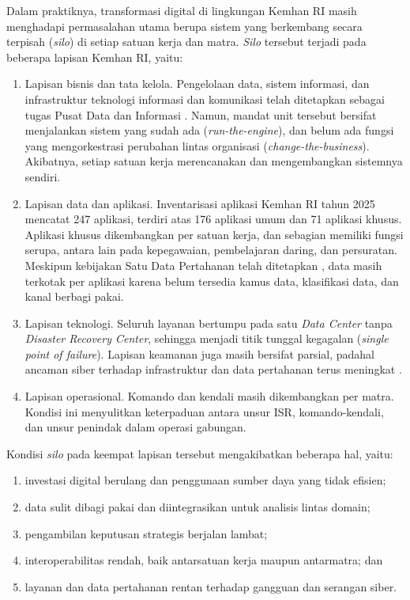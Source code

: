 Dalam praktiknya, transformasi digital di lingkungan Kemhan RI masih menghadapi permasalahan utama berupa sistem yang berkembang secara terpisah (\textit{silo}) di setiap satuan kerja dan matra. \textit{Silo} tersebut terjadi pada beberapa lapisan Kemhan RI, yaitu:
\begin{enumerate}[label=\arabic*.]
\item Lapisan bisnis dan tata kelola. Pengelolaan data, sistem informasi, dan infrastruktur teknologi informasi dan komunikasi telah ditetapkan sebagai tugas Pusat Data dan Informasi \cite{Permenhan30Tahun2025}. Namun, mandat unit tersebut bersifat menjalankan sistem yang sudah ada (\textit{run-the-engine}), dan belum ada fungsi yang mengorkestrasi perubahan lintas organisasi (\textit{change-the-business}). Akibatnya, setiap satuan kerja merencanakan dan mengembangkan sistemnya sendiri.
\item Lapisan data dan aplikasi. Inventarisasi aplikasi Kemhan RI tahun 2025 mencatat 247 aplikasi, terdiri atas 176 aplikasi umum dan 71 aplikasi khusus. Aplikasi khusus dikembangkan per satuan kerja, dan sebagian memiliki fungsi serupa, antara lain pada kepegawaian, pembelajaran daring, dan persuratan. Meskipun kebijakan Satu Data Pertahanan telah ditetapkan \cite{Permenhan1Tahun2023}, data masih terkotak per aplikasi karena belum tersedia kamus data, klasifikasi data, dan kanal berbagi pakai.
\item Lapisan teknologi. Seluruh layanan bertumpu pada satu \textit{Data Center} tanpa \textit{Disaster Recovery Center}, sehingga menjadi titik tunggal kegagalan (\textit{single point of failure}). Lapisan keamanan juga masih bersifat parsial, padahal ancaman siber terhadap infrastruktur dan data pertahanan terus meningkat \cite{Permenhan82Tahun2014}.
\item Lapisan operasional. Komando dan kendali masih dikembangkan per matra. Kondisi ini menyulitkan keterpaduan antara unsur ISR, komando-kendali, dan unsur penindak dalam operasi gabungan.
\end{enumerate}

Kondisi \textit{silo} pada keempat lapisan tersebut mengakibatkan beberapa hal, yaitu:
\begin{enumerate}[label=\alph*.]
\item investasi digital berulang dan penggunaan sumber daya yang tidak efisien;
\item data sulit dibagi pakai dan diintegrasikan untuk analisis lintas domain;
\item pengambilan keputusan strategis berjalan lambat;
\item interoperabilitas rendah, baik antarsatuan kerja maupun antarmatra; dan
\item layanan dan data pertahanan rentan terhadap gangguan dan serangan siber.
\end{enumerate}

